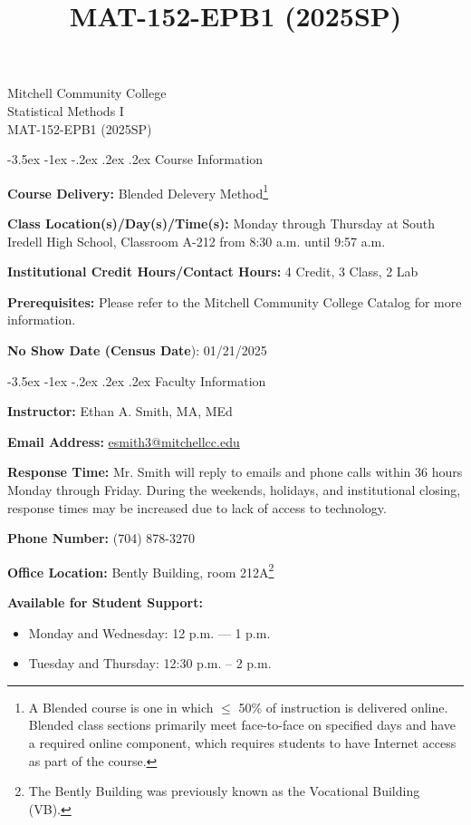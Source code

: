 \documentclass{article}
\title{MAT-152-EPB1 (2025SP)}
\makeatletter
\renewcommand\section{\@startsection{section}{1}{0pt}%
  {-3.5ex \@plus -1ex \@minus -.2ex}%
  {.2ex \@plus.2ex}%
  {\normalfont\Large\bfseries}} %
\makeatother
\begin{document}
\begin{center}
    {\huge Mitchell Community College} \\[6pt]
    {\Large Statistical Methods I} \\[6pt]
    {\Large MAT-152-EPB1 (2025SP)}
\end{center}

\section{Course Information}

\textbf{Course Delivery:} Blended Delevery Method\footnote{A Blended course is one in which $\leq$ 50\% of instruction is delivered online. Blended class sections primarily meet face-to-face on specified days and have a required online component, which requires students to have Internet access as part of the course.}

\textbf{Class Location(s)/Day(s)/Time(s):} Monday through Thursday at South Iredell High School, Classroom A-212 from 8:30 a.m. until 9:57 a.m.

\textbf{Institutional Credit Hours/Contact Hours:} 4 Credit, 3 Class, 2 Lab

\textbf{Prerequisites:} Please refer to the Mitchell Community College Catalog for more information.

\textbf{No Show Date (Census Date}): 01/21/2025

\section{Faculty Information}

\textbf{Instructor:} Ethan A. Smith, MA, MEd

\textbf{Email Address:} \href{mailto:esmith3@mitchellcc.edu}{esmith3@mitchellcc.edu}

\textbf{Response Time:} Mr. Smith will reply to emails and phone calls within 36 hours Monday through Friday. During the weekends, holidays, and institutional closing, response times may be increased due to lack of access to technology.

\textbf{Phone Number:} (704) 878-3270

\textbf{Office Location:} Bently Building, room 212A\footnote{The Bently Building was previously known as the Vocational Building (VB).}

\textbf{Available for Student Support:}

\begin{itemize}
\item Monday and Wednesday: 12 p.m. --- 1 p.m.
\item Tuesday and Thursday: 12:30 p.m. -- 2 p.m.
\end{itemize}
\end{document}
